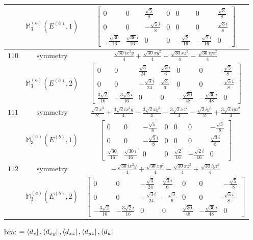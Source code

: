 \documentclass[fleqn,8pt,landscape]{jsarticle}
\begin{document}
\begin{longtable}{ccc}
$  $ & $ \mathbb{M}_{3}^{(a)}(E^{(a)},1) $ & $ \begin{bmatrix} 0 & 0 & \frac{\sqrt{5}}{8} & 0 & 0 & 0 & \frac{\sqrt{3}}{8} \\ 0 & 0 & - \frac{\sqrt{5} i}{8} & 0 & 0 & 0 & \frac{\sqrt{3} i}{8} \\ - \frac{\sqrt{30}}{16} & \frac{\sqrt{30} i}{16} & 0 & 0 & - \frac{\sqrt{2}}{16} & - \frac{\sqrt{2} i}{16} & 0 \end{bmatrix} $ \\ \hline
$ 110 $ & $ \text{symmetry} $ & $ \frac{\sqrt{30} i x^{2} y}{4} + \frac{\sqrt{30} x y^{2}}{4} - \frac{\sqrt{30} x z^{2}}{4} - \frac{\sqrt{30} i y z^{2}}{4} $ \\
$  $ & $ \mathbb{M}_{3}^{(a)}(E^{(a)},2) $ & $ \begin{bmatrix} 0 & 0 & \frac{\sqrt{3}}{24} & \frac{\sqrt{3} i}{6} & 0 & 0 & \frac{\sqrt{5}}{8} \\ 0 & 0 & - \frac{\sqrt{3} i}{24} & \frac{\sqrt{3}}{6} & 0 & 0 & \frac{\sqrt{5} i}{8} \\ \frac{3 \sqrt{2}}{16} & - \frac{3 \sqrt{2} i}{16} & 0 & 0 & - \frac{\sqrt{30}}{48} & - \frac{\sqrt{30} i}{48} & 0 \end{bmatrix} $ \\ \hline
$ 111 $ & $ \text{symmetry} $ & $ \frac{\sqrt{2} x^{3}}{2} + \frac{3 \sqrt{2} i x^{2} y}{4} - \frac{3 \sqrt{2} x y^{2}}{4} - \frac{3 \sqrt{2} x z^{2}}{4} - \frac{\sqrt{2} i y^{3}}{2} + \frac{3 \sqrt{2} i y z^{2}}{4} $ \\
$  $ & $ \mathbb{M}_{3}^{(a)}(E^{(b)},1) $ & $ \begin{bmatrix} 0 & 0 & - \frac{\sqrt{5}}{8} & 0 & 0 & 0 & - \frac{\sqrt{3}}{8} \\ 0 & 0 & - \frac{\sqrt{5} i}{8} & 0 & 0 & 0 & \frac{\sqrt{3} i}{8} \\ \frac{\sqrt{30}}{16} & \frac{\sqrt{30} i}{16} & 0 & 0 & \frac{\sqrt{2}}{16} & - \frac{\sqrt{2} i}{16} & 0 \end{bmatrix} $ \\ \hline
$ 112 $ & $ \text{symmetry} $ & $ - \frac{\sqrt{30} i x^{2} y}{4} + \frac{\sqrt{30} x y^{2}}{4} - \frac{\sqrt{30} x z^{2}}{4} + \frac{\sqrt{30} i y z^{2}}{4} $ \\
$  $ & $ \mathbb{M}_{3}^{(a)}(E^{(b)},2) $ & $ \begin{bmatrix} 0 & 0 & - \frac{\sqrt{3}}{24} & \frac{\sqrt{3} i}{6} & 0 & 0 & - \frac{\sqrt{5}}{8} \\ 0 & 0 & - \frac{\sqrt{3} i}{24} & - \frac{\sqrt{3}}{6} & 0 & 0 & \frac{\sqrt{5} i}{8} \\ - \frac{3 \sqrt{2}}{16} & - \frac{3 \sqrt{2} i}{16} & 0 & 0 & \frac{\sqrt{30}}{48} & - \frac{\sqrt{30} i}{48} & 0 \end{bmatrix} $ \\ \hline
\end{longtable}
bra: $=\bra{d_{v}}, \bra{d_{xy}}, \bra{d_{xz}}, \bra{d_{yz}}, \bra{d_{u}}$
\end{document}
